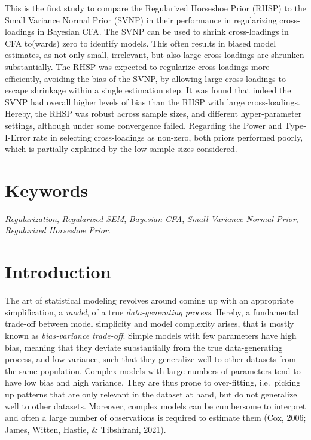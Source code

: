 \documentclass[
  man, donotrepeattitle,floatsintext]{apa6}
\begin{document}
This is the first study to compare the Regularized Horseshoe Prior (RHSP) to the Small Variance Normal Prior (SVNP) in their performance in regularizing cross-loadings in Bayesian CFA. The SVNP can be used to shrink cross-loadings in CFA to(wards) zero to identify models. This often results in biased model estimates, as not only small, irrelevant, but also large cross-loadings are shrunken substantially. The RHSP was expected to regularize cross-loadings more efficiently, avoiding the bias of the SVNP, by allowing large cross-loadings to escape shrinkage within a single estimation step. It was found that indeed the SVNP had overall higher levels of bias than the RHSP with large cross-loadings. Hereby, the RHSP was robust across sample sizes, and different hyper-parameter settings, although under some convergence failed. Regarding the Power and Type-I-Error rate in selecting cross-loadings as non-zero, both priors performed poorly, which is partially explained by the low sample sizes considered.

\hypertarget{keywords}{%
\section{Keywords}\label{keywords}}

\emph{Regularization}, \emph{Regularized SEM}, \emph{Bayesian CFA}, \emph{Small Variance Normal Prior}, \emph{Regularized Horseshoe Prior}.

\clearpage

\hypertarget{introduction}{%
\section{Introduction}\label{introduction}}

The art of statistical modeling revolves around coming up with an appropriate simplification, a \emph{model}, of a true \emph{data-generating process}. Hereby, a fundamental trade-off between model simplicity and model complexity arises, that is mostly known as \emph{bias-variance trade-off}. Simple models with few parameters have high bias, meaning that they deviate substantially from the true data-generating process, and low variance, such that they generalize well to other datasets from the same population. Complex models with large numbers of parameters tend to have low bias and high variance. They are thus prone to over-fitting, i.e.~picking up patterns that are only relevant in the dataset at hand, but do not generalize well to other datasets. Moreover, complex models can be cumbersome to interpret and often a large number of observations is required to estimate them (Cox, 2006; James, Witten, Hastie, \& Tibshirani, 2021).
\end{document}
